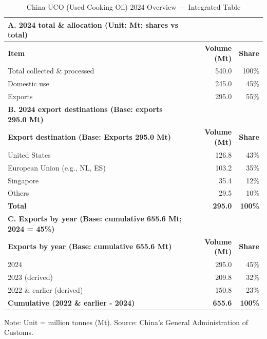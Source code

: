 \documentclass[a4paper,11pt]{article}
\begin{document}
{%
\begin{table}[htbp]
\centering
\caption{ {\color{schoolblue}China UCO (Used Cooking Oil) 2024 Overview — Integrated Table}}
\label{tab:ucosummary}

\begin{tabular}{lrr}
\toprule
\rowcolor{schoolbluelight} %
\textbf{A. 2024 total \& allocation (Unit: Mt; shares vs total)} & & \\
\midrule
\textbf{Item} & \textbf{Volume (Mt)} & \textbf{Share} \\
\cmidrule(lr){1-3}
Total collected \& processed & 540.0 & 100\% \\
Domestic use & 245.0 & 45\% \\
Exports & 295.0 & 55\% \\
\midrule
\rowcolor{schoolbluelight} %
\textbf{B. 2024 export destinations (Base: exports 295.0 Mt)} & & \\
\midrule
\textbf{Export destination (Base: Exports 295.0 Mt)} & \textbf{Volume (Mt)} & \textbf{Share} \\
\cmidrule(lr){1-3}
United States & 126.8 & 43\% \\
European Union (e.g., NL, ES) & 103.2 & 35\% \\
Singapore & 35.4 & 12\% \\
Others & 29.5 & 10\% \\
\textbf{Total} & \textbf{295.0} & \textbf{100\%} \\
\midrule
\rowcolor{schoolbluelight} %
\textbf{C. Exports by year (Base: cumulative 655.6 Mt; 2024 = 45\%)} & & \\
\midrule
\textbf{Exports by year (Base: cumulative 655.6 Mt)} & \textbf{Volume (Mt)} & \textbf{Share} \\
\cmidrule(lr){1-3}
2024 & 295.0 & 45\% \\
2023 (derived) & 209.8 & 32\% \\
2022 \& earlier (derived) & 150.8 & 23\% \\
\textbf{Cumulative (2022 \& earlier - 2024)} & \textbf{655.6} & \textbf{100\%} \\
\bottomrule
\end{tabular}

\medskip
\footnotesize Note: Unit = million tonnes (Mt). Source: China's General Administration of Customs.
\end{table}}
\end{document}
